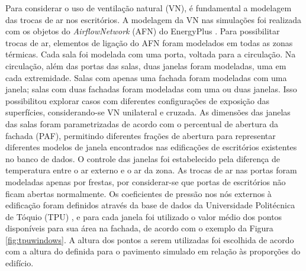 \documentclass[brazil,hardcopy,openany,a5paper]{ufscthesis}
\begin{document}
		Para considerar o uso de ventilação natural (VN), é fundamental a modelagem das trocas de ar nos escritórios. A modelagem da VN nas simulações foi realizada com os objetos do \textit{AirflowNetwork} (AFN) do EnergyPlus \cite{EnergyPlus2018}.
		Para possibilitar trocas de ar, elementos de ligação do AFN foram modelados em todas as zonas térmicas. 
		Cada sala foi modelada com uma porta, voltada para a circulação.
		Na circulação, além das portas das salas, duas janelas foram modeladas, uma em cada extremidade. 
		Salas com apenas uma fachada foram modeladas com uma janela; salas com duas fachadas foram modeladas com uma ou duas janelas. Isso possibilitou explorar casos com diferentes configurações de exposição das superfícies, considerando-se VN unilateral e cruzada.		
		As dimensões das janelas das salas foram parametrizadas de acordo com o percentual de abertura da fachada (PAF), permitindo diferentes frações de abertura para representar diferentes modelos de janela encontrados nas edificações de escritórios existentes no banco de dados.
		O controle das janelas foi estabelecido pela diferença de temperatura entre o ar externo e o ar da zona.
		As trocas de ar nas portas foram modeladas apenas por frestas, por considerar-se que portas de escritórios não ficam abertas normalmente.  %
		Os coeficientes de pressão nos nós externos à edificação foram definidos através da base de dados da Universidade Politécnica de Tóquio (TPU) \cite{TPU2018}, e para cada janela foi utilizado o valor médio dos pontos disponíveis para sua área na fachada, de acordo com o exemplo da Figura \ref{fig:tpuwindows}. A altura dos pontos a serem utilizadas foi escolhida de acordo com a altura do definida para o pavimento simulado em relação às proporções do edifício.
		
\end{document}
